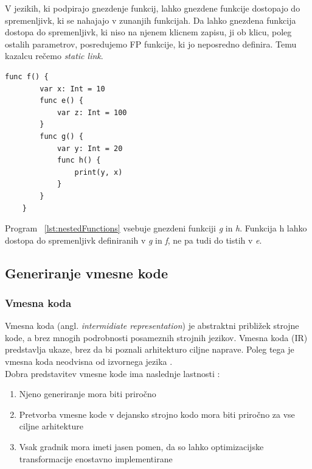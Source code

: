 \documentclass[a4paper, 12p]{book}
\begin{document}
V jezikih, ki podpirajo gnezdenje funkcij, lahko gnezdene funkcije dostopajo do spremenljivk, ki se nahajajo v zunanjih funkcijah. Da lahko gnezdena funkcija dostopa do spremenljivk, ki niso na njenem klicnem zapisu, ji ob klicu, poleg ostalih parametrov, posredujemo FP funkcije, ki jo neposredno definira. Temu kazalcu rečemo \textit{static link}. 

\renewcommand{\lstlistingname}{Program}
\begin{lstlisting}[caption={Primer gnezdenih funkcij}, captionpos=b, label={lst:nestedFunctions}]
    func f() {
        var x: Int = 10
        func e() {
            var z: Int = 100
        }
        func g() {
            var y: Int = 20
            func h() {
                print(y, x)
            }
        }
    }
\end{lstlisting}

Program ~\ref{lst:nestedFunctions} vsebuje gnezdeni funkciji \textit{g} in \textit{h}. Funkcija h lahko dostopa do spremenljivk definiranih v \textit{g} in \textit{f}, ne pa tudi do tistih v \textit{e}.

\subsection{Generiranje vmesne kode}   

\subsubsection{Vmesna koda}

Vmesna koda (angl. \textit{intermidiate representation}) je abstraktni približek strojne kode, a brez mnogih podrobnosti posameznih strojnih jezikov. Vmesna koda (IR) predstavlja ukaze, brez da bi poznali arhitekturo ciljne naprave. Poleg tega je vmesna koda neodvisna od izvornega jezika \cite{modernCompiler}. \\
\indent Dobra predstavitev vmesne kode ima naslednje lastnosti \cite{modernCompiler}:

\begin{enumerate}
	\item Njeno generiranje mora biti priročno
	\item Pretvorba vmesne kode v dejansko strojno kodo mora biti priročno za vse ciljne arhitekture
	\item Vsak gradnik mora imeti jasen pomen, da so lahko optimizacijske transformacije enostavno implementirane
\end{enumerate}
\end{document}
